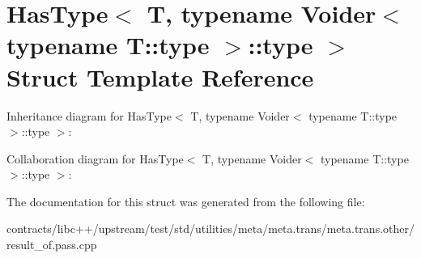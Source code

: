 \hypertarget{struct_has_type_3_01_t_00_01typename_01_voider_3_01typename_01_t_1_1type_01_4_1_1type_01_4}{}\section{Has\+Type$<$ T, typename Voider$<$ typename T\+:\+:type $>$\+:\+:type $>$ Struct Template Reference}
\label{struct_has_type_3_01_t_00_01typename_01_voider_3_01typename_01_t_1_1type_01_4_1_1type_01_4}


Inheritance diagram for Has\+Type$<$ T, typename Voider$<$ typename T\+:\+:type $>$\+:\+:type $>$\+:


Collaboration diagram for Has\+Type$<$ T, typename Voider$<$ typename T\+:\+:type $>$\+:\+:type $>$\+:


The documentation for this struct was generated from the following file\+:\begin{DoxyCompactItemize}
\item 
contracts/libc++/upstream/test/std/utilities/meta/meta.\+trans/meta.\+trans.\+other/result\+\_\+of.\+pass.\+cpp\end{DoxyCompactItemize}
